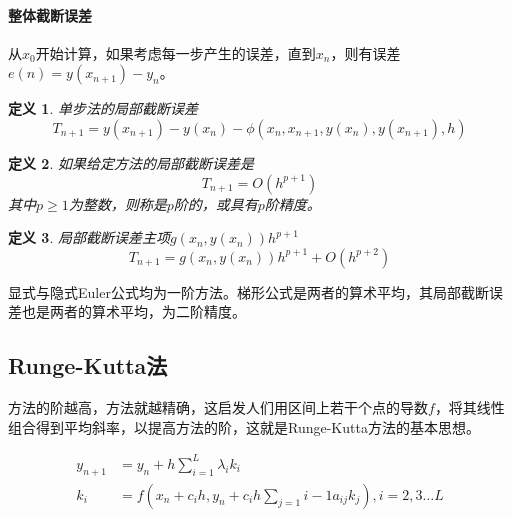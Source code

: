 \documentclass[twoside]{article}
\newtheorem{definition}{定义}[section]
\begin{document}
\paragraph{整体截断误差}
从$x_0$开始计算，如果考虑每一步产生的误差，直到$x_n$，则有误差$e(n)=y(x_{n+1})-y_n$。
\begin{definition}
  单步法的局部截断误差
  \begin{equation}
    T_{n+1}=y(x_{n+1})-y(x_n)-\phi(x_n, x_{n+1}, y(x_n),y(x_{n+1}),h)
  \end{equation}
\end{definition}
\begin{definition}
  如果给定方法的局部截断误差是
  \begin{equation}
    T_{n+1}=O(h^{p+1})
  \end{equation}
  其中$p\ge 1$为整数，则称是$p$阶的，或具有$p$阶精度。
\end{definition}
\begin{definition}
  局部截断误差主项$g(x_n, y(x_n)) h^{p+1}$
  \begin{equation}
      T_{n+1}=g(x_n, y(x_n)) h^{p+1} + O(h^{p+2})
  \end{equation}
\end{definition}

显式与隐式Euler公式均为一阶方法。梯形公式是两者的算术平均，其局部截断误差也是两者的算术平均，为二阶精度。
\subsection{Runge-Kutta法}
        方法的阶越高，方法就越精确，这启发人们用区间上若干个点的导数$f$，将其线性组合得到平均斜率，以提高方法的阶，这就是Runge-Kutta方法的基本思想。

\begin{equation}
    \begin{aligned}
        y_{n+1} &= y_n + h \sum_{i=1}^{L} \lambda_i k_i \\
        k_i &= f(x_n + c_i h, y_n + c_i h \sum_{j=1}{i-1} a_{ij} k_j), i=2,3\dots L \\
    \end{aligned}
\end{equation}
\end{document}
